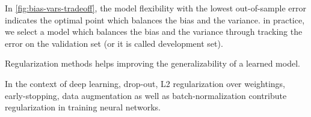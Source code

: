 \documentclass{kthreport}
\begin{document}
In \cref{fig:bias-vars-tradeoff}, the model flexibility with the lowest out-of-sample error
indicates the optimal point which balances the bias and the variance.
in practice, we select a model which balances the bias and the variance through
tracking the error on the validation set (or it is called development set).

Regularization methods helps improving the generalizability of a learned model.

In the context of deep learning, drop-out, L2 regularization over weightings, early-stopping,
data augmentation as well as batch-normalization
contribute regularization in training neural networks. \cite{luo2018-bn-regularization}


\begin{figure}[!ht]
    \begin{minipage}{.5\linewidth}
        \centering
    \end{minipage}%
    \begin{minipage}{.5\linewidth}
        \centering
\end{minipage}
\end{figure}
\end{document}
